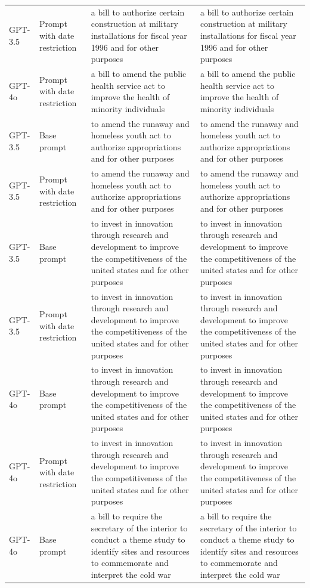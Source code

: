 \begin{longtable}{>{\raggedright\arraybackslash}p{1.4cm}>{\raggedright\arraybackslash}p{1.4cm}>{\raggedright\arraybackslash}p{5.5cm}>{\raggedright\arraybackslash}p{5.5cm}}
GPT-3.5 & Prompt with date restriction & a bill to authorize certain construction at military installations for fiscal year 1996 and for other purposes & a bill to authorize certain construction at military installations for fiscal year 1996 and for other purposes\\
GPT-4o & Prompt with date restriction & a bill to amend the public health service act to improve the health of minority individuals & a bill to amend the public health service act to improve the health of minority individuals\\
GPT-3.5 & Base prompt & to amend the runaway and homeless youth act to authorize appropriations and for other purposes & to amend the runaway and homeless youth act to authorize appropriations and for other purposes\\
GPT-3.5 & Prompt with date restriction & to amend the runaway and homeless youth act to authorize appropriations and for other purposes & to amend the runaway and homeless youth act to authorize appropriations and for other purposes\\
GPT-3.5 & Base prompt & to invest in innovation through research and development to improve the competitiveness of the united states and for other purposes & to invest in innovation through research and development to improve the competitiveness of the united states and for other purposes\\
GPT-3.5 & Prompt with date restriction & to invest in innovation through research and development to improve the competitiveness of the united states and for other purposes & to invest in innovation through research and development to improve the competitiveness of the united states and for other purposes\\
GPT-4o & Base prompt & to invest in innovation through research and development to improve the competitiveness of the united states and for other purposes & to invest in innovation through research and development to improve the competitiveness of the united states and for other purposes\\
GPT-4o & Prompt with date restriction & to invest in innovation through research and development to improve the competitiveness of the united states and for other purposes & to invest in innovation through research and development to improve the competitiveness of the united states and for other purposes\\
GPT-4o & Base prompt & a bill to require the secretary of the interior to conduct a theme study to identify sites and resources to commemorate and interpret the cold war & a bill to require the secretary of the interior to conduct a theme study to identify sites and resources to commemorate and interpret the cold war\\

\end{longtable}

